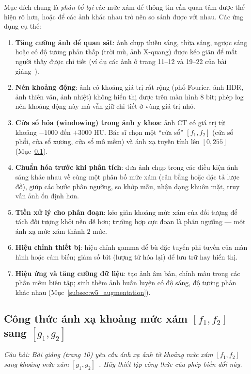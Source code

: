 Mục đích chung là \emph{phân bố lại} các mức xám để thông tin cần quan tâm được thể hiện rõ hơn, hoặc để các ảnh khác nhau trở nên so sánh được với nhau. Các ứng dụng cụ thể:
\begin{enumerate}
    \item \textbf{Tăng cường ảnh để quan sát}: ảnh chụp thiếu sáng, thừa sáng, ngược sáng hoặc có độ tương phản thấp (trời mù, ảnh X-quang) được kéo giãn để mắt người thấy được chi tiết (ví dụ các ảnh ở trang 11--12 và 19--22 của bài giảng~\citep{xlav_lec3}).
    \item \textbf{Nén khoảng động}: ảnh có khoảng giá trị rất rộng (phổ Fourier, ảnh HDR, ảnh thiên văn, ảnh nhiệt) không hiển thị được trên màn hình 8 bit; phép log nén khoảng động này mà vẫn giữ chi tiết ở vùng giá trị nhỏ.
    \item \textbf{Cửa sổ hóa (windowing) trong ảnh y khoa}: ảnh CT có giá trị từ khoảng $-1000$ đến $+3000$ HU. Bác sĩ chọn một ``cửa sổ'' $[f_1, f_2]$ (cửa sổ phổi, cửa sổ xương, cửa sổ mô mềm) và ánh xạ tuyến tính lên $[0, 255]$ (Mục~\ref{subsec:w5_range_map}).
    \item \textbf{Chuẩn hóa trước khi phân tích}: đưa ảnh chụp trong các điều kiện ánh sáng khác nhau về cùng một phân bố mức xám (cân bằng hoặc đặc tả lược đồ), giúp các bước phân ngưỡng, so khớp mẫu, nhận dạng khuôn mặt, truy vấn ảnh ổn định hơn.
    \item \textbf{Tiền xử lý cho phân đoạn}: kéo giãn khoảng mức xám của đối tượng để tách đối tượng khỏi nền dễ hơn; trường hợp cực đoan là phân ngưỡng — một ánh xạ mức xám thành $2$ mức.
    \item \textbf{Hiệu chỉnh thiết bị}: hiệu chỉnh gamma để bù đặc tuyến phi tuyến của màn hình hoặc cảm biến; giảm số bit (lượng tử hóa lại) để lưu trữ hay hiển thị.
    \item \textbf{Hiệu ứng và tăng cường dữ liệu}: tạo ảnh âm bản, chỉnh màu trong các phần mềm biên tập; sinh thêm ảnh huấn luyện có độ sáng, độ tương phản khác nhau (Mục~\ref{subsec:w5_augmentation}).
\end{enumerate}

\subsection{Công thức ánh xạ khoảng mức xám \texorpdfstring{$[f_1, f_2]$}{[f1, f2]} sang \texorpdfstring{$[g_1, g_2]$}{[g1, g2]}}
\label{subsec:w5_range_map}

\textit{Câu hỏi: Bài giảng (trang 10) yêu cầu ánh xạ ảnh từ khoảng mức xám $[f_1, f_2]$ sang khoảng mức xám $[g_1, g_2]$~\citep{xlav_lec3}. Hãy thiết lập công thức của phép biến đổi này.}

